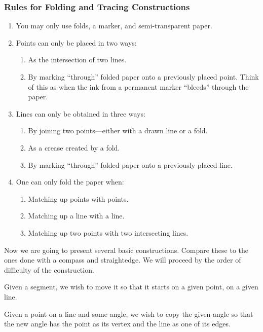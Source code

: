 \subsubsection*{Rules for Folding and Tracing Constructions}
\begin{enumerate}
\item You may only use folds, a marker, and semi-transparent paper.
\item Points can only be placed in two ways:
\begin{enumerate}
\item As the intersection of two lines. 
\item By marking ``through'' folded paper onto a previously placed
  point. Think of this as when the ink from a permanent marker
  ``bleeds'' through the paper.
\end{enumerate}
\item Lines can only be obtained in three ways:
\begin{enumerate}
\item By joining two points---either with a drawn line or a fold.
\item As a crease created by a fold. 
\item By marking ``through'' folded paper onto a previously placed
  line.
\end{enumerate}
\item One can only fold the paper when:
\begin{enumerate}
\item Matching up points with points.
\item Matching up a line with a line.
\item Matching up two points with two intersecting lines.
\end{enumerate}
\end{enumerate}


Now we are going to present several basic constructions. Compare these
to the ones done with a compass and straightedge. We will proceed by
the order of difficulty of the construction.


\begin{construction}  
Given a segment, we wish to move it so that it starts on a given
point, on a given line.
\end{construction}


\begin{construction} 
Given a point on a line and some angle, we wish to copy the given
angle so that the new angle has the point as its vertex and the line
as one of its edges.
\end{construction}

